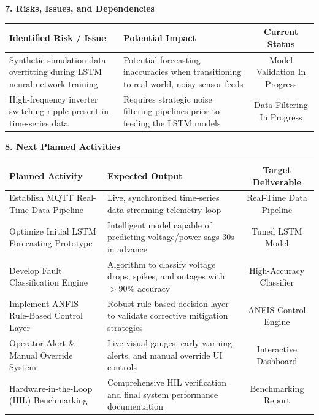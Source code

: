 \documentclass[11pt,a4paper]{article}
\newcommand{\sectionheader}[1]{\vspace{10pt}\noindent\Large\textbf{#1}\vspace{4pt}\normalsize}
\newcommand{\tablehead}[1]{\textbf{#1}}
\begin{document}
\sectionheader{7. Risks, Issues, and Dependencies}
\begin{table}[H]
    \renewcommand{\arraystretch}{1.4}
    \begin{tabularx}{\textwidth}{|X|X|c|}
    \hline
    \tablehead{Identified Risk / Issue} & \tablehead{Potential Impact} & \tablehead{Current Status} \\
    \hline
    Synthetic simulation data overfitting during LSTM neural network training & Potential forecasting inaccuracies when transitioning to real-world, noisy sensor feeds & Model Validation In Progress \\
    \hline
    High-frequency inverter switching ripple present in time-series data & Requires strategic noise filtering pipelines prior to feeding the LSTM models & Data Filtering In Progress \\
    \hline
    \end{tabularx}
\end{table}

\vspace{-5pt}

\sectionheader{8. Next Planned Activities}
\begin{table}[H]
    \renewcommand{\arraystretch}{1.4}
    \begin{tabularx}{\textwidth}{|X|X|c|}
    \hline
    \tablehead{Planned Activity} & \tablehead{Expected Output} & \tablehead{Target Deliverable} \\
    \hline
    Establish MQTT Real-Time Data Pipeline & Live, synchronized time-series data streaming telemetry loop & Real-Time Data Pipeline \\
    \hline
    Optimize Initial LSTM Forecasting Prototype & Intelligent model capable of predicting voltage/power sags 30s in advance & Tuned LSTM Model \\
    \hline
    Develop Fault Classification Engine & Algorithm to classify voltage drops, spikes, and outages with $>90\%$ accuracy & High-Accuracy Classifier \\
    \hline
    Implement ANFIS Rule-Based Control Layer & Robust rule-based decision layer to validate corrective mitigation strategies & ANFIS Control Engine \\
    \hline
    Operator Alert \& Manual Override System & Live visual gauges, early warning alerts, and manual override UI controls & Interactive Dashboard \\
    \hline
    Hardware-in-the-Loop (HIL) Benchmarking & Comprehensive HIL verification and final system performance documentation & Benchmarking Report \\
    \hline
    \end{tabularx}
\end{table}
\end{document}
